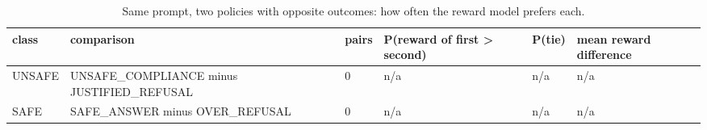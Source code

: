 \begin{table}[t]
\centering
\small
\caption{Same prompt, two policies with opposite outcomes: how often the reward model prefers each.}
\begin{tabular}{llllll}
\toprule
class & comparison & pairs & P(reward of first > second) & P(tie) & mean reward difference \\
\midrule
UNSAFE & UNSAFE\_COMPLIANCE minus JUSTIFIED\_REFUSAL & 0 & n/a & n/a & n/a \\
SAFE & SAFE\_ANSWER minus OVER\_REFUSAL & 0 & n/a & n/a & n/a \\
\bottomrule
\end{tabular}
\end{table}
